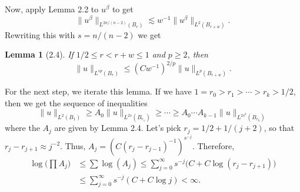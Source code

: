 \documentclass[UTF8,11pt]{ctexart}
\newtheorem*{lemma}{Lemma}
\theoremstyle{definition}
\begin{document}
Now, apply Lemma 2.2 to $u^\beta$ to get
\[\|u^\beta\|_{L^{2n/(n-2)}(B_r)}\lesssim w^{-1}\|u^\beta\|_{L^2(B_{r+w})}.\]
Rewriting this with $s=n/(n-2)$ we get
\begin{lemma}[2.4]
If $1/2\leq r<r+w\leq1$ and $p\geq2$, then
\[\|u\|_{L^{sp}(B_r)}\leq(Cw^{-1})^{2/p}\|u\|_{L^p(B_{r+w})}.\]
\end{lemma}
For the next step, we iterate this lemma. If we have $1=r_0>r_1>\cdots>r_k>1/2$, then we get the sequence of inequalities
\[\|u\|_{L^2(B_1)}\geq A_0\|u\|_{L^{2s}(B_{r_1})}\geq\cdots\geq A_0\cdots A_{k-1}\|u\|_{L^{2s^k}(B_{r_k})}\]
where the $A_j$ are given by Lemma 2.4. Let's pick $r_j=1/2+1/(j+2)$, so that $r_j-r_{j+1}\approx j^{-2}$. Thus, $A_j=(C(r_j-r_{j-1})^{-1})^{s^{-j}}$. Therefore,
\begin{align*}
\log\Big(\prod A_j\Big)&\leq\sum\log(A_j)\leq\sum_{j=0}^\infty s^{-j}\big(C+C\log(r_j-r_{j+1})\big)\\
&\leq\sum_{j=0}^\infty s^{-j}(C+C\log j)<\infty.
\end{align*}
\end{document}

